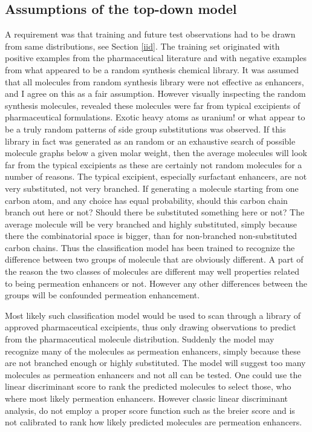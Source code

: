 \subsection{Assumptions of the top-down model}
A requirement was that training and future test observations had to be drawn from same distributions, see Section \ref{iid}. The training set originated with positive examples from the pharmaceutical literature and with negative examples from what appeared to be a random synthesis chemical library. It was assumed that all molecules from random synthesis library were not effective as enhancers, and  I agree on this as a fair assumption. However visually inspecting the random synthesis molecules, revealed these molecules were far from typical excipients of pharmaceutical formulations. Exotic heavy atoms as uranium! or what appear to be a truly random patterns of side group substitutions was observed. If this library in fact was generated as an random or an exhaustive search of possible molecule graphs below a given molar weight, then the average molecules will look far from the typical excipients as these are certainly not random molecules for a number of reasons. The typical excipient, especially surfactant enhancers, are not very substituted, not very branched. If generating a molecule starting from one carbon atom, and any choice has equal probability, should this carbon chain branch out here or not? Should there be substituted something here or not? The average molecule will be very branched and highly substituted, simply because there the combinatorial space is bigger, than for non-branched non-substituted carbon chains. Thus the classification model has been trained to recognize the difference between two groups of molecule that are obviously different. A part of the reason the two classes of molecules are different may well properties related to being permeation enhancers or not. However any other differences between the groups will be confounded permeation enhancement.

Most likely such classification model would be used to scan through a library of approved pharmaceutical excipients, thus only drawing observations to predict from the pharmaceutical molecule distribution. Suddenly the model may recognize many of the molecules as permeation enhancers, simply because these are not branched enough or highly substituted. The model will suggest too many molecules as permeation enhancers and not all can be tested. One could use the linear discriminant score to rank the predicted molecules to select those, who where most likely permeation enhancers. However classic linear discriminant analysis, do not employ a proper score function such as the breier score and is not calibrated to rank how likely predicted molecules are permeation enhancers.

